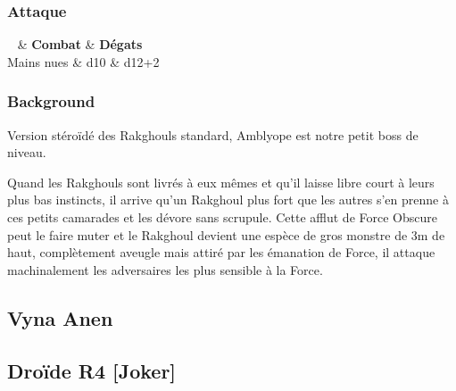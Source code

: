 \documentclass{jdrp}
\begin{document}
\subsubsection{Attaque}
\begin{itemtable}[ X c c ]
	~ 			& \textbf{Combat} 	& \textbf{Dégats} \\
	Mains nues	& d10 				& d12+2 
\end{itemtable}

\newpage
\subsubsection{Background}
Version stéroïdé des Rakghouls standard, Amblyope est notre petit boss de niveau.

Quand les Rakghouls sont livrés à eux mêmes et qu'il laisse libre court à leurs plus bas instincts, il arrive qu'un Rakghoul plus fort que les autres s'en prenne à ces petits camarades et les dévore sans scrupule. Cette afflut de Force Obscure peut le faire muter et le Rakghoul devient une espèce de gros monstre de 3m de haut, complètement aveugle mais attiré par les émanation de Force, il attaque machinalement les adversaires les plus sensible à la Force. 

\clearpage
\subsection{Vyna Anen}

\subsection{Droïde R4 [Joker]}

	\onecolumn
	\nocite{*}
	\printbibliography
\end{document}

